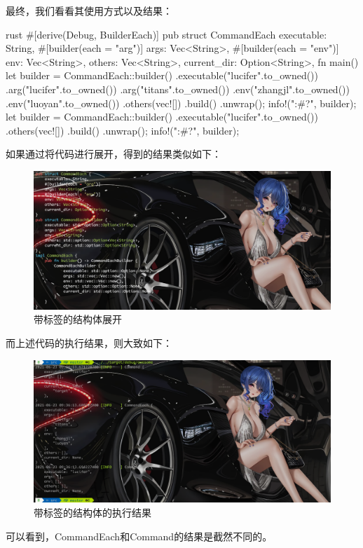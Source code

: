 最终，我们看看其使用方式以及结果：
\begin{code-block}{rust}
#[derive(Debug, BuilderEach)]
pub struct CommandEach {
    executable: String,
    #[builder(each = "arg")]
    args: Vec<String>,
    #[builder(each = "env")]
    env: Vec<String>,
    others: Vec<String>,
    current_dir: Option<String>,
}
fn main() {
    let builder = CommandEach::builder()
        .executable("lucifer".to_owned())
        .arg("lucifer".to_owned())
        .arg("titans".to_owned())
        .env("zhangjl".to_owned())
        .env("luoyan".to_owned())
        .others(vec![])
        .build()
        .unwrap();
    info!("{:#?}", builder);
    let builder = CommandEach::builder()
        .executable("lucifer".to_owned())
        .others(vec![])
        .build()
        .unwrap();
    info!("{:#?}", builder);
}
\end{code-block}

如果通过将代码进行展开，得到的结果类似如下：
\begin{figure}[H]
  \centering
  \includegraphics[width=\linewidth]{rust_label_expand.png}
  \caption{带标签的结构体展开}
  \label{fig:rust_label_expand}
\end{figure}
而上述代码的执行结果，则大致如下：
\begin{figure}[H]
  \centering
  \includegraphics[width=\linewidth]{rust_label_result.png}
  \caption{带标签的结构体的执行结果}
  \label{fig:rust_label_result}
\end{figure}
可以看到，CommandEach和Command的结果是截然不同的。

